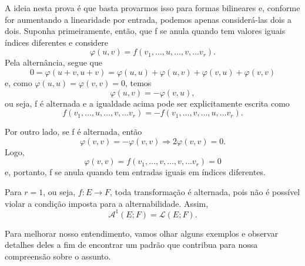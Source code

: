 \documentclass[../differential_forms.tex]{subfiles}
\begin{document}
\begin{proof*}
	A ideia nesta prova é que basta provarmos isso para formas bilineares e, conforme for aumentando a linearidade por entrada, podemos
	apenas considerá-las dois a dois.
	Suponha primeiramente, então, que f se anula quando tem valores iguais índices diferentes e considere
	\[
		\varphi (u, v)=f(v_1,\dotsc , u,\dotsc ,v,\dotsc v_r).
	\]
	Pela alternância, segue que
	\[
		0=\varphi (u+v, u+v) = \varphi(u, u)+\varphi (u, v)+\varphi (v, u)+\varphi (v, v)
	\]
	e, como \(\varphi (u, u)=\varphi (v, v)=0\), temos
	\[
		\varphi (u,v) = -\varphi (v, u),
	\]
	ou seja, f é alternada e a igualdade acima pode ser explicitamente escrita como
	\[
		f(v_1,\dotsc , u,\dotsc ,v,\dotsc v_r) = -f(v_1,\dotsc , v,\dotsc ,u,\dotsc v_r).
	\]

	Por outro lado, se f é alternada, então
	\[
		\varphi (v, v)=-\varphi (v, v) \Rightarrow 2\varphi (v, v)=0.
	\]
	Logo,
	\[
		\varphi (v, v)=f(v_1,\dotsc , v,\dotsc ,v,\dotsc v_r) = 0
	\]
	e, portanto, f se anula quando tem entradas iguais em índices diferentes. \qedsymbol
\end{proof*}

\begin{example}
	Para \(r=1\), ou seja, \(f:E\rightarrow F\), toda transformação é alternada, pois não é possível violar a condição imposta para
	a alternabilidade. Assim,
	\[
		\mathcal{A}^{1}(E; F)=\mathcal{L}(E; F).
	\]
\end{example}
Para melhorar nosso entendimento, vamos olhar alguns exemplos e observar detalhes deles a fim de encontrar um padrão que contribua
para nossa compreensão sobre o assunto.
\end{document}
